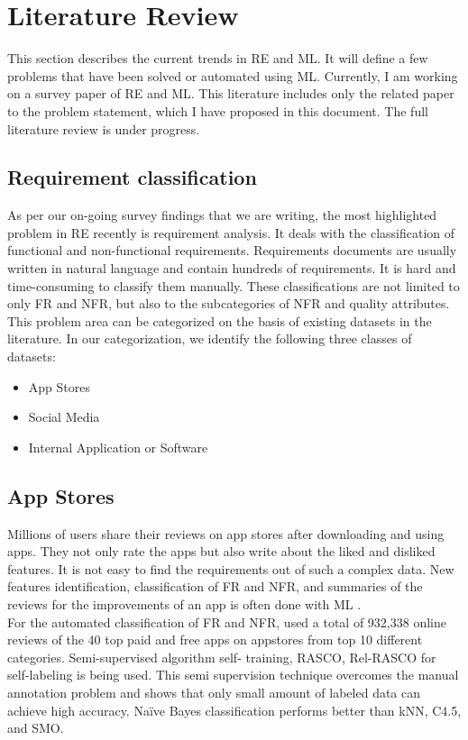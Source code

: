 \section{Literature Review}
This section describes the current trends in RE and ML. It will define a few problems that have
been solved or automated using ML. Currently, I am working on a survey paper of RE and ML.
This literature includes only the related paper to the problem statement, which I have proposed in this
document. The full literature review is under progress.
\subsection{Requirement classification}
As per our on-going survey findings that we are writing, the most highlighted problem in RE
recently is requirement analysis. It deals with the classification of functional and non-functional
requirements. Requirements documents are usually written in natural language and
contain hundreds of requirements. It is hard and time-consuming to classify them manually.
These classifications are not limited to only FR and NFR, but also to the subcategories of NFR
and quality attributes. This problem area can be categorized on the basis of existing datasets in
the literature. In our categorization, we identify the following three classes of datasets:
\begin{itemize}
\item{App Stores}
\item{Social Media}
\item{Internal Application or Software}
\end{itemize}
\subsection{App Stores}
Millions of users share their reviews on app stores after downloading and using apps. They not only rate the apps but also write about the liked and disliked features. It is not easy to
find the requirements out of such a complex data. New features identification, classification of
FR and NFR, and summaries of the reviews for the improvements of an app is often done with ML
\cite{deocadez2017} \cite{lu2017automatic} \cite{maalej2015bug} \cite{jiang2014}. \\

	For the automated classification of FR and NFR, \cite{deocadez2017}  used a total of 932,338 online
reviews of the 40 top paid and free apps on appstores from top 10 different categories. Semi-supervised algorithm self- training, RASCO, Rel-RASCO for self-labeling is being used. This
semi supervision technique overcomes the manual annotation problem and shows that only
small amount of labeled data can achieve high accuracy. Naïve Bayes classification performs better than kNN, C4.5, and SMO.\\

